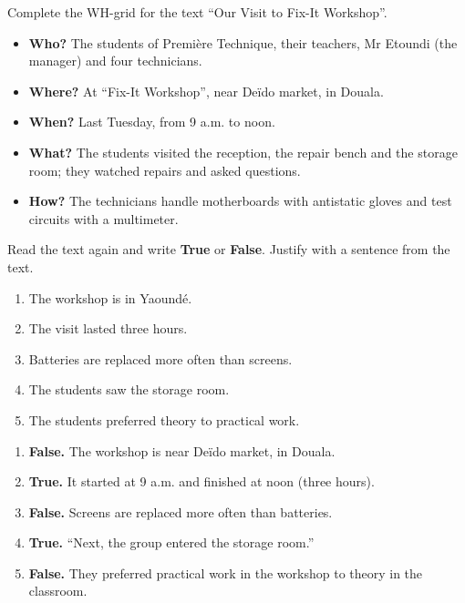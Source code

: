 \documentclass[11pt]{article}
\begin{document}
\begin{exoresolu}
Complete the WH-grid for the text ``Our Visit to Fix-It Workshop''.
\tcblower
\begin{itemize}
\item \textbf{Who?} The students of Première Technique, their teachers, Mr Etoundi (the manager) and four technicians.
\item \textbf{Where?} At ``Fix-It Workshop'', near Deïdo market, in Douala.
\item \textbf{When?} Last Tuesday, from 9 a.m. to noon.
\item \textbf{What?} The students visited the reception, the repair bench and the storage room; they watched repairs and asked questions.
\item \textbf{How?} The technicians handle motherboards with antistatic gloves and test circuits with a multimeter.
\end{itemize}
\end{exoresolu}

\begin{exercice}
Read the text again and write \textbf{True} or \textbf{False}. Justify with a sentence from the text.
\begin{enumerate}
\item The workshop is in Yaoundé.
\item The visit lasted three hours.
\item Batteries are replaced more often than screens.
\item The students saw the storage room.
\item The students preferred theory to practical work.
\end{enumerate}
\end{exercice}

\begin{corrige}
\begin{enumerate}
\item \textbf{False.} The workshop is near Deïdo market, in Douala.
\item \textbf{True.} It started at 9 a.m. and finished at noon (three hours).
\item \textbf{False.} Screens are replaced more often than batteries.
\item \textbf{True.} ``Next, the group entered the storage room.''
\item \textbf{False.} They preferred practical work in the workshop to theory in the classroom.
\end{enumerate}
\end{corrige}
\end{document}
